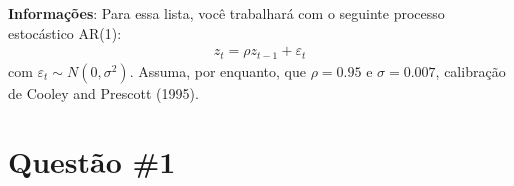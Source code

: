 \documentclass[10pt]{article}
\newcommand\0{\mathbf{0}}
\newcounter{exercise}
\begin{document}
\newdimen\headerwidth


\begin{center}
\end{center}

\textbf{Informações}: Para essa lista, você trabalhará com o seguinte processo estocástico AR(1):
\begin{align*}
z_t = \rho z_{t-1} + \varepsilon_t
\end{align*}
com $\varepsilon_t \sim N(0, \sigma^2)$. Assuma, por enquanto, que $\rho = 0.95$ e $\sigma = 0.007$, calibração de Cooley and Prescott (1995).

\section*{Questão \#1}
\end{document}
